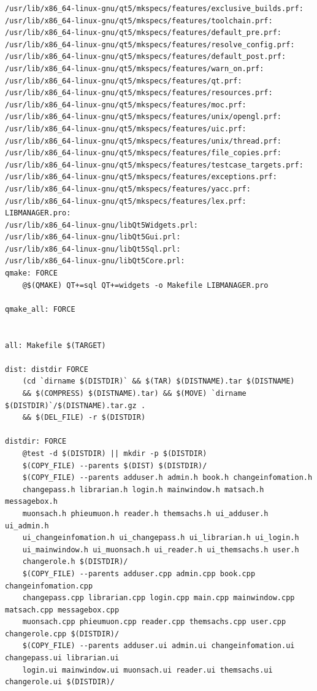 \documentclass[a4paper]{article}
\begin{document}
\begin{verbatim}
/usr/lib/x86_64-linux-gnu/qt5/mkspecs/features/exclusive_builds.prf:
/usr/lib/x86_64-linux-gnu/qt5/mkspecs/features/toolchain.prf:
/usr/lib/x86_64-linux-gnu/qt5/mkspecs/features/default_pre.prf:
/usr/lib/x86_64-linux-gnu/qt5/mkspecs/features/resolve_config.prf:
/usr/lib/x86_64-linux-gnu/qt5/mkspecs/features/default_post.prf:
/usr/lib/x86_64-linux-gnu/qt5/mkspecs/features/warn_on.prf:
/usr/lib/x86_64-linux-gnu/qt5/mkspecs/features/qt.prf:
/usr/lib/x86_64-linux-gnu/qt5/mkspecs/features/resources.prf:
/usr/lib/x86_64-linux-gnu/qt5/mkspecs/features/moc.prf:
/usr/lib/x86_64-linux-gnu/qt5/mkspecs/features/unix/opengl.prf:
/usr/lib/x86_64-linux-gnu/qt5/mkspecs/features/uic.prf:
/usr/lib/x86_64-linux-gnu/qt5/mkspecs/features/unix/thread.prf:
/usr/lib/x86_64-linux-gnu/qt5/mkspecs/features/file_copies.prf:
/usr/lib/x86_64-linux-gnu/qt5/mkspecs/features/testcase_targets.prf:
/usr/lib/x86_64-linux-gnu/qt5/mkspecs/features/exceptions.prf:
/usr/lib/x86_64-linux-gnu/qt5/mkspecs/features/yacc.prf:
/usr/lib/x86_64-linux-gnu/qt5/mkspecs/features/lex.prf:
LIBMANAGER.pro:
/usr/lib/x86_64-linux-gnu/libQt5Widgets.prl:
/usr/lib/x86_64-linux-gnu/libQt5Gui.prl:
/usr/lib/x86_64-linux-gnu/libQt5Sql.prl:
/usr/lib/x86_64-linux-gnu/libQt5Core.prl:
qmake: FORCE
	@$(QMAKE) QT+=sql QT+=widgets -o Makefile LIBMANAGER.pro

qmake_all: FORCE


all: Makefile $(TARGET)

dist: distdir FORCE
	(cd `dirname $(DISTDIR)` && $(TAR) $(DISTNAME).tar $(DISTNAME) 
	&& $(COMPRESS) $(DISTNAME).tar) && $(MOVE) `dirname $(DISTDIR)`/$(DISTNAME).tar.gz . 
	&& $(DEL_FILE) -r $(DISTDIR)

distdir: FORCE
	@test -d $(DISTDIR) || mkdir -p $(DISTDIR)
	$(COPY_FILE) --parents $(DIST) $(DISTDIR)/
	$(COPY_FILE) --parents adduser.h admin.h book.h changeinfomation.h 
	changepass.h librarian.h login.h mainwindow.h matsach.h messagebox.h 
	muonsach.h phieumuon.h reader.h themsachs.h ui_adduser.h ui_admin.h 
	ui_changeinfomation.h ui_changepass.h ui_librarian.h ui_login.h 
	ui_mainwindow.h ui_muonsach.h ui_reader.h ui_themsachs.h user.h 
	changerole.h $(DISTDIR)/
	$(COPY_FILE) --parents adduser.cpp admin.cpp book.cpp changeinfomation.cpp 
	changepass.cpp librarian.cpp login.cpp main.cpp mainwindow.cpp matsach.cpp messagebox.cpp 
	muonsach.cpp phieumuon.cpp reader.cpp themsachs.cpp user.cpp changerole.cpp $(DISTDIR)/
	$(COPY_FILE) --parents adduser.ui admin.ui changeinfomation.ui changepass.ui librarian.ui 
	login.ui mainwindow.ui muonsach.ui reader.ui themsachs.ui changerole.ui $(DISTDIR)/



\end{verbatim}
\end{document}
